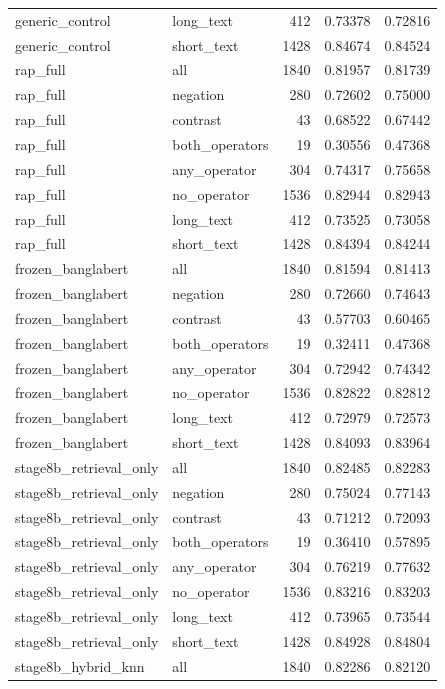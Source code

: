 \begin{tabular}{llrrr}
generic_control & long_text & 412 & 0.73378 & 0.72816 \\
generic_control & short_text & 1428 & 0.84674 & 0.84524 \\
rap_full & all & 1840 & 0.81957 & 0.81739 \\
rap_full & negation & 280 & 0.72602 & 0.75000 \\
rap_full & contrast & 43 & 0.68522 & 0.67442 \\
rap_full & both_operators & 19 & 0.30556 & 0.47368 \\
rap_full & any_operator & 304 & 0.74317 & 0.75658 \\
rap_full & no_operator & 1536 & 0.82944 & 0.82943 \\
rap_full & long_text & 412 & 0.73525 & 0.73058 \\
rap_full & short_text & 1428 & 0.84394 & 0.84244 \\
frozen_banglabert & all & 1840 & 0.81594 & 0.81413 \\
frozen_banglabert & negation & 280 & 0.72660 & 0.74643 \\
frozen_banglabert & contrast & 43 & 0.57703 & 0.60465 \\
frozen_banglabert & both_operators & 19 & 0.32411 & 0.47368 \\
frozen_banglabert & any_operator & 304 & 0.72942 & 0.74342 \\
frozen_banglabert & no_operator & 1536 & 0.82822 & 0.82812 \\
frozen_banglabert & long_text & 412 & 0.72979 & 0.72573 \\
frozen_banglabert & short_text & 1428 & 0.84093 & 0.83964 \\
stage8b_retrieval_only & all & 1840 & 0.82485 & 0.82283 \\
stage8b_retrieval_only & negation & 280 & 0.75024 & 0.77143 \\
stage8b_retrieval_only & contrast & 43 & 0.71212 & 0.72093 \\
stage8b_retrieval_only & both_operators & 19 & 0.36410 & 0.57895 \\
stage8b_retrieval_only & any_operator & 304 & 0.76219 & 0.77632 \\
stage8b_retrieval_only & no_operator & 1536 & 0.83216 & 0.83203 \\
stage8b_retrieval_only & long_text & 412 & 0.73965 & 0.73544 \\
stage8b_retrieval_only & short_text & 1428 & 0.84928 & 0.84804 \\
stage8b_hybrid_knn & all & 1840 & 0.82286 & 0.82120 \\

\end{tabular}
